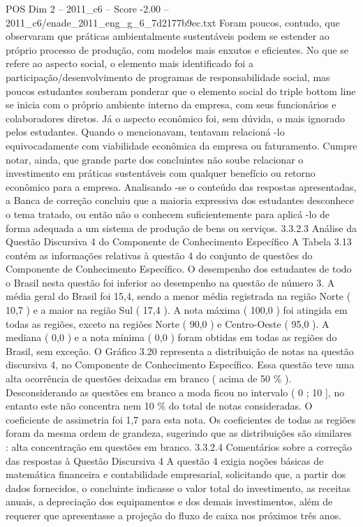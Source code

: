 \begin{textsample}{POS Dim 2 – 2011\_c6 – Score -2.00 – 2011\_c6/enade\_2011\_eng\_g\_6\_7d2177b9ec.txt}
Foram poucos, contudo, que observaram que práticas ambientalmente sustentáveis podem se estender ao próprio processo de produção, com modelos mais enxutos e eficientes.
No que se refere ao aspecto social, o elemento mais identificado foi a participação/desenvolvimento de programas de responsabilidade social, mas poucos estudantes souberam ponderar que o elemento social do triple bottom line se inicia com o próprio ambiente interno da empresa, com seus funcionários e colaboradores diretos.
Já o aspecto econômico foi, sem dúvida, o mais ignorado pelos estudantes.
Quando o mencionavam, tentavam relacioná -lo equivocadamente com viabilidade econômica da empresa ou faturamento.
Cumpre notar, ainda, que grande parte dos concluintes não soube relacionar o investimento em práticas sustentáveis com qualquer benefício ou retorno econômico para a empresa.
Analisando -se o conteúdo das respostas apresentadas, a Banca de correção concluiu que a maioria expressiva dos estudantes desconhece o tema tratado, ou então não o conhecem suficientemente para aplicá -lo de forma adequada a um sistema de produção de bens ou serviços. 3.3.2.3 Análise da Questão Discursiva 4 do Componente de Conhecimento Específico A Tabela 3.13 contém as informações relativas à questão 4 do conjunto de questões do Componente de Conhecimento Específico.
O desempenho dos estudantes de todo o Brasil nesta questão foi inferior ao desempenho na questão de número 3.
A média geral do Brasil foi 15,4, sendo a menor média registrada na região Norte ( 10,7 ) e a maior na região Sul ( 17,4 ).
A nota máxima ( 100,0 ) foi atingida em todas as regiões, exceto na regiões Norte ( 90,0 ) e Centro-Oeste ( 95,0 ).
A mediana ( 0,0 ) e a nota mínima ( 0,0 ) foram obtidas em todas as regiões do Brasil, sem exceção.
O Gráfico 3.20 representa a distribuição de notas na questão discursiva 4, no Componente de Conhecimento Específico.
Essa questão teve uma alta ocorrência de questões deixadas em branco ( acima de 50 \% ).
Desconsiderando as questões em branco a moda ficou no intervalo ( 0 ; 10 ], no entanto este não concentra nem 10 \% do total de notas consideradas.
O coeficiente de assimetria foi 1,7 para esta nota.
Os coeficientes de todas as regiões foram da mesma ordem de grandeza, sugerindo que as distribuições são similares : alta concentração em questões em branco. 3.3.2.4 Comentários sobre a correção das respostas à Questão Discursiva 4 A questão 4 exigia noções básicas de matemática financeira e contabilidade empresarial, solicitando que, a partir dos dados fornecidos, o concluinte indicasse o valor total do investimento, as receitas anuais, a depreciação dos equipamentos e dos demais investimentos, além de requerer que apresentasse a projeção do fluxo de caixa nos próximos três anos.

\end{textsample}
